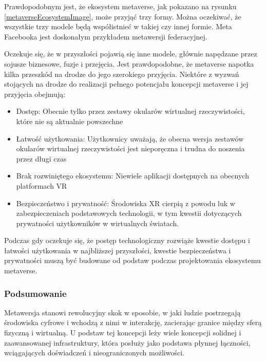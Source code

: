 Prawdopodobnym jest, że ekosystem metaverse, jak pokazano na rysunku \ref{metaverseEcosystemImage}, może przyjąć trzy formy. Można oczekiwać, że wszystkie trzy modele będą współistnieć w takiej czy innej formie. Meta Facebooka jest doskonałym przykładem metawersji federacyjnej\cite{metaverseSecurityIssuesChallengesAndViableZTAModel}. 

Oczekuje się, że w przyszłości pojawią się inne modele, głównie napędzane przez sojusze biznesowe, fuzje i przejęcia. Jest prawdopodobne, że metaverse napotka kilka przeszkód na drodze do jego szerokiego przyjęcia. Niektóre z wyzwań stojących na drodze do realizacji pełnego potencjału koncepcji metaverse i jej przyjęcia obejmują:

\begin{itemize}
    \item Dostęp: Obecnie tylko przez zestawy okularów wirtualnej rzeczywistości, które nie są aktualnie powszechne
    \item Łatwość użytkowania: Użytkownicy uważają, że obecna wersja zestawów okularów wirtualnej rzeczywistości jest nieporęczna i trudna do noszenia przez długi czas
    \item Brak rozwiniętego ekosystemu: Niewiele aplikacji dostępnych na obecnych platformach VR
    \item Bezpieczeństwo i prywatność: Środowiska XR cierpią z powodu luk w zabezpieczeniach podstawowych technologii, w tym kwestii dotyczących prywatności użytkowników w wirtualnych światach. 
\end{itemize}

Podczas gdy oczekuje się, że postęp technologiczny rozwiąże kwestie dostępu i łatwości użytkowania w najbliższej przyszłości, kwestie bezpieczeństwa i prywatności muszą być budowane od podstaw podczas projektowania ekosystemu metaverse\cite{metaverseSecurityIssuesChallengesAndViableZTAModel}. 


\subsubsection{Podsumowanie}

Metawersja stanowi rewolucyjny skok w sposobie, w jaki ludzie postrzegają środowiska cyfrowe i wchodzą z nimi w interakcję, zacierając granice między sferą fizyczną i wirtualną. U podstaw tej koncepcji leży wiele koncepcji solidnej i zaawansowanej infrastruktury, która posłuży jako podstawa płynnej łączności, wciągających doświadczeń i nieograniczonych możliwości. 

